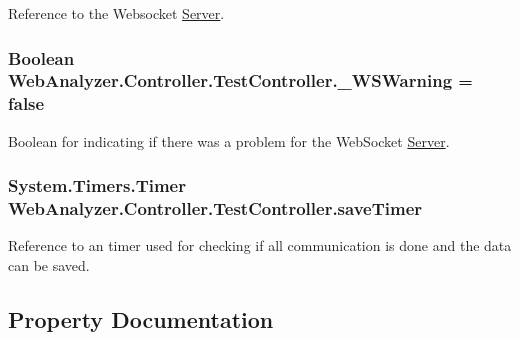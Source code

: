 Reference to the Websocket \hyperlink{namespace_web_analyzer_1_1_server}{Server}. 

\hypertarget{class_web_analyzer_1_1_controller_1_1_test_controller_a517bab0ee0c22871788bd498de86c27e}{}
\subsubsection[{\+\_\+\+W\+S\+Warning}]{\setlength{\rightskip}{0pt plus 5cm}Boolean Web\+Analyzer.\+Controller.\+Test\+Controller.\+\_\+\+W\+S\+Warning = false\hspace{0.3cm}{\ttfamily [private]}}\label{class_web_analyzer_1_1_controller_1_1_test_controller_a517bab0ee0c22871788bd498de86c27e}


Boolean for indicating if there was a problem for the Web\+Socket \hyperlink{namespace_web_analyzer_1_1_server}{Server}. 

\hypertarget{class_web_analyzer_1_1_controller_1_1_test_controller_a484747e48ceb23e931111018ed87d8e1}{}
\subsubsection[{save\+Timer}]{\setlength{\rightskip}{0pt plus 5cm}System.\+Timers.\+Timer Web\+Analyzer.\+Controller.\+Test\+Controller.\+save\+Timer\hspace{0.3cm}{\ttfamily [private]}}\label{class_web_analyzer_1_1_controller_1_1_test_controller_a484747e48ceb23e931111018ed87d8e1}


Reference to an timer used for checking if all communication is done and the data can be saved. 



\subsection{Property Documentation}
\hypertarget{class_web_analyzer_1_1_controller_1_1_test_controller_a741cf98b95422a4a307bf8834db147b3}{}
